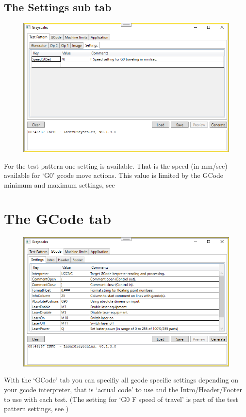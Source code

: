 \subsection{The Settings sub tab}\label{TestPatternSettingsTab}
\begin{figure}[h!]
    \centering
    \includegraphics[width=0.8\linewidth]{./images/Settings.png}
\end{figure}

For the test pattern one setting is available. That is the speed (in mm/sec) available for `G0' gcode move actions. This value is limited by the GCode minimum and maximum settings,
see 

\section{The GCode tab}\label{GCodeTab}
\begin{figure}[h!]
    \centering
    \includegraphics[width=0.8\linewidth]{./images/GCode-Settings.png}
\end{figure}

With the `GCode' tab you can specifiy all gcode specific settings depending on your gcode interpreter, that is `actual code' to use and the Intro/Header/Footer to use with
each test. (The setting for `G0 F speed of travel' is part of the test pattern settings, see )

